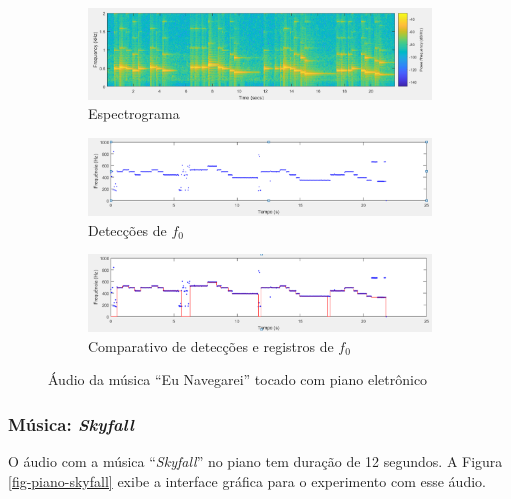 \begin{figure}
	
	\begin{subfigure}{1\textwidth}
		\includegraphics[width=\linewidth]{pasta1_figuras/piano-navegarei-2.png}
		\caption{Espectrograma}
		\label{fig-piano-navegarei-2}
	\end{subfigure}
	\hspace*{\fill} %
	\begin{subfigure}{1\textwidth}
		\includegraphics[width=\linewidth]{pasta1_figuras/piano-navegarei-3.png}
		\caption{Detecções de $f_0$}
		\label{fig-piano-navegarei-3}
	\end{subfigure}
	\hspace*{\fill} %
	\begin{subfigure}{1\textwidth}
		\includegraphics[width=\linewidth]{pasta1_figuras/piano-navegarei-4.png}
		\caption{Comparativo de detecções e registros de $f_0$}
		\label{fig-piano-navegarei-4}
	\end{subfigure}
	\caption{Áudio da música ``Eu Navegarei'' tocado com piano eletrônico}
\end{figure}

\subsubsection{Música: \textit{Skyfall}}

O áudio com a música ``\textit{Skyfall}'' no piano tem duração de 12 segundos. A Figura \ref{fig-piano-skyfall} exibe a interface gráfica para o experimento com esse áudio.

